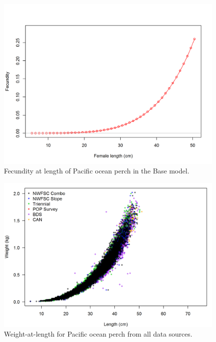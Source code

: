 \documentclass[12pt,]{article}
\begin{document}
\begin{figure}
\centering
\includegraphics{r4ss/plots_mod1/bio9_fecundity_len.png}
\caption{Fecundity at length of Pacific ocean perch in the Base model.
\label{fig:fecundity}}
\end{figure}

\FloatBarrier 

\begin{figure}
\centering
\includegraphics{Figures/weightAtLengthBySource.png}
\caption{Weight-at-length for Pacific ocean perch from all data sources.
\label{fig:Wt_len}}
\end{figure}
\end{document}

